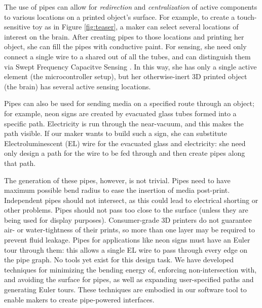 The use of pipes can allow for \emph{redirection} and \emph{centralization} of active components to various locations on a printed object's surface.   For example, to create a touch-sensitive toy as in Figure \ref{fig:teaser}, a maker can select several locations of interest on the brain.  After creating pipes to those locations and printing her object, she can fill the pipes with conductive paint.  For sensing, she need only connect a single wire to a shared out of all the tubes, and can distinguish them via Swept Frequency Capacitve Sensing \cite{Sato-touche}.  In this way, she has only a single active element (the microcontroller setup), but her otherwise-inert 3D printed object (the brain) has several active sensing locations.

Pipes can also be used for sending media on a specified route through an object; for example, neon signs are created by evacuated glass tubes formed into a specific path.  Electricity is run through the near-vacuum, and this makes the path visible.  If our maker wants to build such a sign, she can substitute Electroluminescent (EL) wire for the evacuated glass and electricity: she need only design a path for the wire to be fed through and then create pipes along that path.

The generation of these pipes, however, is not trivial.  Pipes need to have maximum possible bend radius to ease the insertion of media post-print.  Independent pipes should not intersect, as this could lead to electrical shorting or other problems.  Pipes should not pass too close to the surface (unless they are being used for display purposes).  Consumer-grade 3D printers do not guarantee air- or water-tightness of their prints, so more than one layer may be required to prevent fluid leakage.  Pipes for applications like neon signs must have an Euler tour through them: this allows a single EL wire to pass through every edge on the pipe graph.  No tools yet exist for this design task.  We have developed techniques for minimizing the bending energy of, enforcing non-intersection with, and avoiding the surface for pipes, as well as expanding user-specified paths and generating Euler tours.  These techniques are embodied in our software tool to enable makers to create pipe-powered interfaces.

